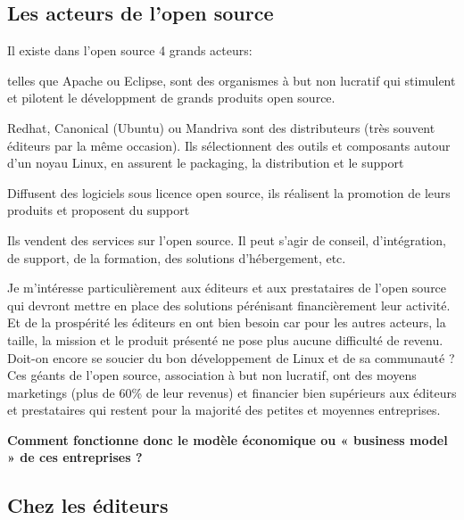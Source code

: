 		\subsection{Les acteurs de l'open source}
			Il existe dans l'open source 4 grands acteurs:

			\begin{description}[font=\color{burntorange}]
				\item[Les fondations:] telles que Apache ou Eclipse, sont des organismes à but non lucratif qui stimulent et pilotent le développment de grands produits open source.
				\item[Les distributeurs:] Redhat, Canonical (Ubuntu) ou Mandriva sont des distributeurs (très souvent éditeurs par la même occasion). Ils sélectionnent des outils et composants autour d'un noyau Linux, en assurent le packaging, la distribution et le support
				\item[Les éditeurs:] Diffusent des logiciels sous licence open source, ils réalisent la promotion de leurs produits et proposent du support
				\item[Les prestataires: ] Ils vendent des services sur l'open source. Il peut s'agir de conseil, d'intégration, de support, de la formation, des solutions d'hébergement, etc.
			\end{description}

			Je m'intéresse particulièrement aux éditeurs et aux prestataires de l'open source qui devront mettre en place des solutions pérénisant financièrement leur activité.\\

			Et de la prospérité les éditeurs en ont bien besoin car pour les autres acteurs, la taille, la mission et le produit présenté ne pose plus aucune difficulté de revenu. Doit-on encore se soucier du bon développement de Linux et de sa communauté ? Ces géants de l'open source, association à but non lucratif, ont des moyens marketings (plus de 60\% de leur revenus) et financier bien supérieurs aux éditeurs et prestataires qui restent pour la majorité des petites et moyennes entreprises.

			\textbf{Comment fonctionne donc le modèle économique ou « business model » de ces entreprises ?}\\

		\subsection{Chez les éditeurs}

